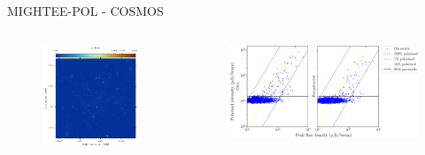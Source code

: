 \documentclass[xetex,aspectratio=169]{beamer}
\begin{document}
	\begin{frame}{MIGHTEE-POL - COSMOS}
		
		\begin{columns}
			\begin{column}{0.48\textwidth}
				\begin{figure}
					\centering
					\includegraphics[width=\textwidth, keepaspectratio]{figures/meerkat/continuum/COSMOS_only_radio.pdf}
				\end{figure}
			\end{column}
			
			\begin{column}{0.48\textwidth}
				\begin{figure}
					\centering
					\includegraphics[width=\textwidth, keepaspectratio]{figures/meerkat/pol_vs_peak_flux_density.pdf}
				\end{figure}			
			\end{column}
		\end{columns}
	\end{frame}
\end{document}
